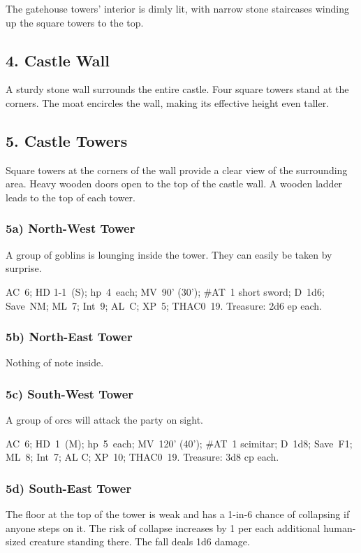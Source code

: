 \documentclass[english,12pt,openany,letterpaper]{book}
\begin{document}
The gatehouse towers' interior is dimly lit, with narrow stone staircases winding up the square towers to the top.

\subsection{4. Castle Wall}

A sturdy stone wall surrounds the entire castle. Four square towers stand at the corners. The moat encircles the wall, making its effective height even taller.

\break

\subsection{5. Castle Towers}

Square towers at the corners of the wall provide a clear view of the surrounding area. Heavy wooden doors open to the top of the castle wall. A wooden ladder leads to the top of each tower.

\skipline
\subsubsection{5a) North-West Tower}

A group of goblins is lounging inside the tower. They can easily be taken by surprise.

AC~6; HD 1-1~(S); hp~4~each; MV~90' (30'); \#AT~1 short sword; D~1d6; Save~NM; ML~7; Int~9; AL~C; XP~5; THAC0~19. Treasure: 2d6 ep each.

\skipline
\subsubsection{5b) North-East Tower}

Nothing of note inside.

\skipline
\subsubsection{5c) South-West Tower}

A group of orcs will attack the party on sight.

AC~6; HD~1~(M); hp~5~each; MV~120' (40'); \#AT~1 scimitar; D~1d8; Save~F1; ML~8; Int~7; AL C; XP~10; THAC0~19. Treasure: 3d8 cp each.

\skipline
\subsubsection{5d) South-East Tower}

The floor at the top of the tower is weak and has a 1-in-6 chance of collapsing if anyone steps on it. The risk of collapse increases by 1 per each additional human-sized creature standing there. The fall deals 1d6 damage.

\clearpage
\end{document}

